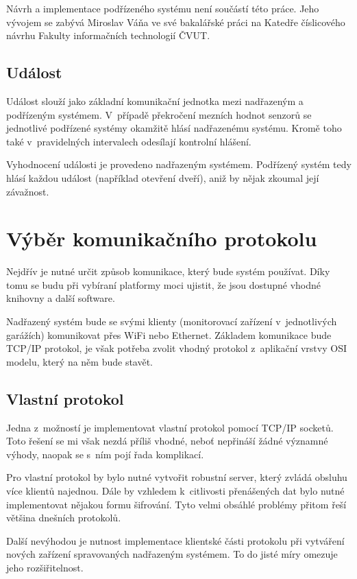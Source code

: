 Návrh a implementace podřízeného systému není součástí této práce. Jeho vývojem se zabývá Miroslav Váňa ve své bakalářské práci na Katedře číslicového návrhu Fakulty informačních technologií ČVUT.

\subsection{Událost}

Událost slouží jako základní komunikační jednotka mezi nadřazeným a podřízeným systémem. V~případě překročení mezních hodnot senzorů se jednotlivé podřízené systémy okamžitě hlásí nadřazenému systému. Kromě toho také v~pravidelných intervalech odesílají kontrolní hlášení. 

Vyhodnocení události je provedeno nadřazeným systémem. Podřízený systém tedy hlásí každou událost (například otevření dveří), aniž by nějak zkoumal její závažnost.

\section{Výběr komunikačního protokolu}
\label{sec:an_protocol}

Nejdřív je nutné určit způsob komunikace, který bude systém používat. Díky tomu se budu při vybíraní platformy moci ujistit, že jsou dostupné vhodné knihovny a další software. 

Nadřazený systém bude se svými klienty (monitorovací zařízení v~jednotlivých garážích) komunikovat přes WiFi nebo Ethernet. Základem komunikace bude TCP/IP protokol, je však potřeba zvolit vhodný protokol z~aplikační vrstvy OSI modelu, který na něm bude stavět.

\subsection{Vlastní protokol}

Jedna z~možností je implementovat vlastní protokol pomocí TCP/IP socketů. Toto řešení se mi však nezdá příliš vhodné, neboť nepřináší žádné významné výhody, naopak se s~ním pojí řada komplikací.

Pro vlastní protokol by bylo nutné vytvořit robustní server, který zvládá obsluhu více klientů najednou. Dále by vzhledem k~citlivosti přenášených dat bylo nutné implementovat nějakou formu šifrování. Tyto velmi obsáhlé problémy přitom řeší většina dnešních protokolů.

Další nevýhodou je nutnost implementace klientské části protokolu při vytváření nových zařízení spravovaných nadřazeným systémem. To do jisté míry omezuje jeho rozšiřitelnost.

